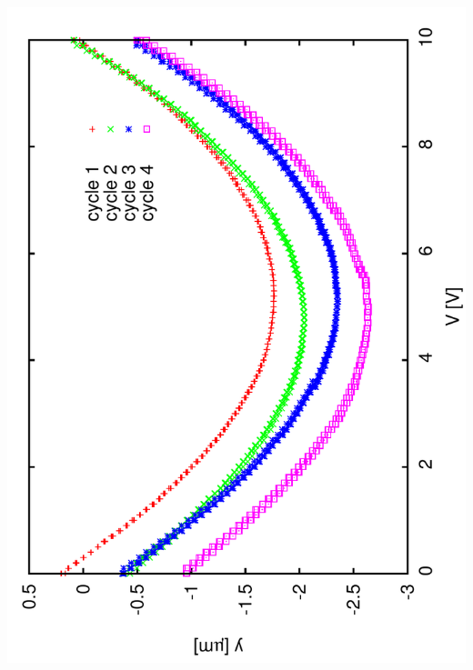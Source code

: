 \documentclass[a4paper,11pt]{book}
\begin{document}
\includegraphics[angle=-90,scale=0.15]{image42.pdf}
\end{document}

